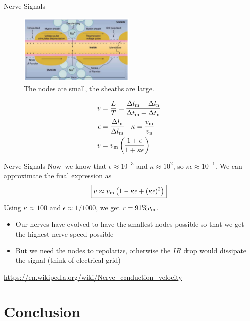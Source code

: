 \documentclass{beamer}
\begin{document}
\begin{frame}{Nerve Signals}
\begin{figure}
\centering
\includegraphics[width=0.5\textwidth]{figures/nerve5.png}
\caption{\label{fig:nerve4b} The nodes are small, the sheaths are large.}
\end{figure}
\small
\begin{align}
v &= \frac{L}{T} = \frac{\Delta l_{\rm m} + \Delta l_{\rm n}}{\Delta t_{\rm m} + \Delta t_{\rm n}} \\
\epsilon &= \frac{\Delta l_{\rm n}}{\Delta l_{\rm m}} ~~~ \kappa = \frac{v_{\rm m}}{v_{\rm n}} \\
v &= v_{\rm m} \left( \frac{1+\epsilon}{1+\kappa\epsilon} \right)
\end{align}
\end{frame}

\begin{frame}{Nerve Signals}
Now, we know that $\epsilon \approx 10^{-3}$ and $\kappa \approx 10^2$, so $\kappa\epsilon \approx 10^{-1}$.  We can approximate the final expression as
\begin{equation}
\boxed{
v \approx v_{\rm m} \left( 1-\kappa\epsilon + (\kappa\epsilon)^2 \right)
}
\end{equation}
Using $\kappa \approx 100$ and $\epsilon \approx 1/1000$, we get $v = 91\% v_{\rm m}$.
\begin{itemize}
\item Our nerves have evolved to have the smallest nodes possible so that we get the highest nerve speed possible
\item But we need the nodes to repolarize, otherwise the $IR$ drop would dissipate the signal (think of electrical grid)
\end{itemize}
\url{https://en.wikipedia.org/wiki/Nerve_conduction_velocity}
\end{frame}

\section{Conclusion}
\end{document}
